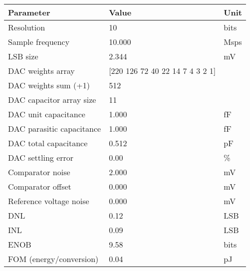\begin{tabular}{lll}
\toprule
Parameter & Value & Unit \\
\midrule
Resolution & 10 & bits \\
Sample frequency & 10.000 & Msps \\
LSB size & 2.344 & mV \\
DAC weights array & [220 126  72  40  22  14   7   4   3   2   1] &  \\
DAC weights sum (+1) & 512 &  \\
DAC capacitor array size & 11 &  \\
DAC unit capacitance & 1.000 & fF \\
DAC parasitic capacitance & 1.000 & fF \\
DAC total capacitance & 0.512 & pF \\
DAC settling error & 0.00 & \% \\
Comparator noise & 2.000 & mV \\
Comparator offset & 0.000 & mV \\
Reference voltage noise & 0.000 & mV \\
DNL & 0.12 & LSB \\
INL & 0.09 & LSB \\
ENOB & 9.58 & bits \\
FOM (energy/conversion) & 0.04 & pJ \\
\bottomrule
\end{tabular}
